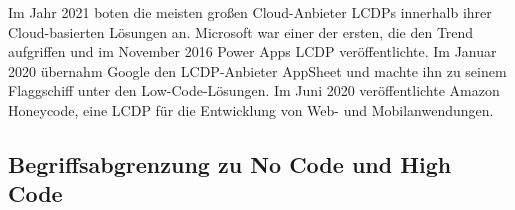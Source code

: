 \documentclass[12pt]{article} %
\begin{document}
	Im Jahr 2021 boten die meisten großen Cloud-Anbieter LCDPs innerhalb ihrer Cloud-basierten Lösungen an. Microsoft war einer der ersten, die den Trend aufgriffen und im November 2016 Power Apps LCDP veröffentlichte. Im Januar 2020 übernahm Google den LCDP-Anbieter AppSheet und machte ihn zu seinem Flaggschiff unter den Low-Code-Lösungen. Im Juni 2020 veröffentlichte Amazon Honeycode, eine LCDP für die Entwicklung von Web- und Mobilanwendungen. \cite{DiRuscio.2022}
		

	
	
	
	
	
	
	\subsection{Begriffsabgrenzung zu No Code und High Code}
	
\end{document}
